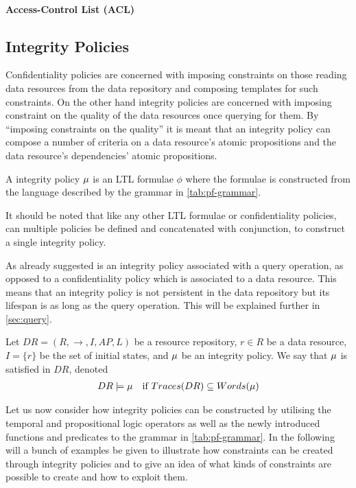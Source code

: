 \paragraph{Access-Control List (ACL)}

\subsection{Integrity Policies}
Confidentiality policies are concerned with imposing constraints on those reading data resources from the data repository and composing templates for such constraints. On the other hand integrity policies are concerned with imposing constraint on the quality of the data resources once querying for them. By ``imposing constraints on the quality'' it is meant that an integrity policy can compose a number of criteria on a data resource's atomic propositions and the data resource's dependencies' atomic propositions.
\begin{definition}\label{def:ip}
A integrity policy $\mu$ is an LTL formulae $\phi$ where the formulae is constructed from the language described by the grammar in \autoref{tab:pf-grammar}.
\end{definition}
It should be noted that like any other LTL formulae or confidentiality policies, can multiple policies be defined and concatenated with conjunction, to construct a single integrity policy.

As already suggested is an integrity policy associated with a query operation, as opposed to a confidentiality policy which is associated to a data resource. This means that an integrity policy is not persistent in the data repository but its lifespan is as long as the query operation. This will be explained further in \autoref{sec:query}.

\begin{definition}\label{def:sip}
Let $DR = \left(R, \longrightarrow, I, AP, L \right)$ be a resource repository, $r \in R$ be a data resource, $I = \{r\}$ be the set of initial states, and $\mu$ be an integrity policy. We say that $\mu$ is satisfied in $DR$, denoted
\begin{align*}
    DR \models \mu \quad \text{if } Traces(DR) \subseteq Words(\mu)
\end{align*}
\end{definition}

Let us now consider how integrity policies can be constructed by utilising the temporal and propositional logic operators as well as the newly introduced functions and predicates to the grammar in \autoref{tab:pf-grammar}. In the following will a bunch of examples be given to illustrate how constraints can be created through integrity policies and to give an idea of what kinds of constraints are possible to create and how to exploit them.

